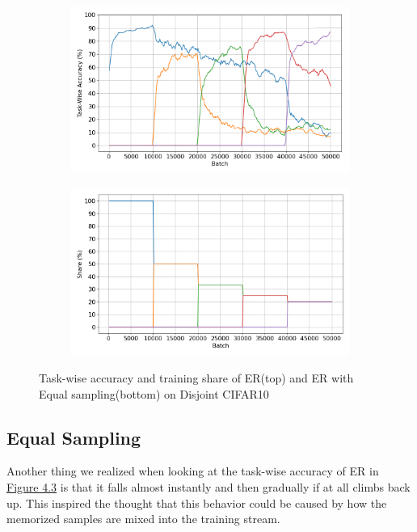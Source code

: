 \documentclass[oneside]{ctuthesis}
\begin{document}
\begin{figure}[t]
    \begin{subfigure}[t]{0.48\linewidth}
        \centering
        \includegraphics[width=\linewidth]{figures/CIFAR10_DISJOINT_RESERVOIR_EQUAL_SAMPLING_accuracy.png}
    \end{subfigure}
    \hfill
    \begin{subfigure}[t]{0.48\linewidth}
        \centering
        \includegraphics[width=\linewidth]{figures/CIFAR10_DISJOINT_RESERVOIR_EQUAL_SAMPLING_shares.png}
    \end{subfigure}

    \caption{Task-wise accuracy and training share of ER(top) and ER with Equal sampling(bottom) on Disjoint CIFAR10}
    \label{fig:er-equal-sampling}
\end{figure}

\subsection{Equal Sampling}
Another thing we realized when looking at the task-wise accuracy of ER in \hyperref[fig:er-equal-sampling]{Figure 4.3} is that it falls almost instantly and then gradually if at all climbs back up. This inspired the thought that this behavior could be caused by how the memorized samples are mixed into the training stream.
\end{document}
